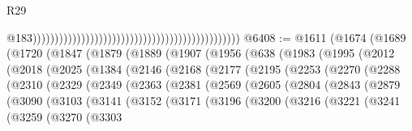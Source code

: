 \begin{lexlean}{R29}
\begin{coremodule}
                                                                                                  @183)))))))))))))))))))))))))))))))))))))))))))))))
@6408 := @1611
    (@1674
      (@1689
        (@1720
          (@1847
            (@1879
              (@1889
                (@1907
                  (@1956
                    (@638
                      (@1983
                        (@1995
                          (@2012
                            (@2018
                              (@2025
                                (@1384
                                  (@2146
                                    (@2168
                                      (@2177
                                        (@2195
                                          (@2253
                                            (@2270
                                              (@2288
                                                (@2310
                                                  (@2329
                                                    (@2349
                                                      (@2363
                                                        (@2381
                                                          (@2569
                                                            (@2605
                                                              (@2804
                                                                (@2843
                                                                  (@2879
                                                                    (@3090
                                                                      (@3103
                                                                        (@3141
                                                                          (@3152
                                                                            (@3171
                                                                              (@3196
                                                                                (@3200
                                                                                  (@3216
                                                                                    (@3221
                                                                                      (@3241
                                                                                        (@3259
                                                                                          (@3270
                                                                                            (@3303

\end{coremodule}
\end{lexlean}
